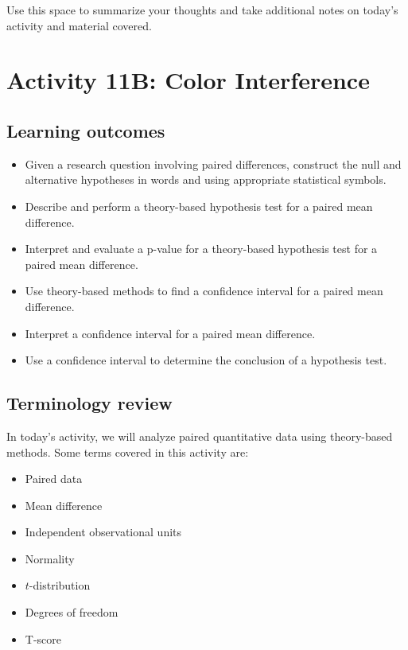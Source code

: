 \documentclass[
]{report}
\begin{document}
Use this space to summarize your thoughts and take additional notes on today's activity and material covered.

\newpage

\hypertarget{activity-11b-color-interference}{%
\section{Activity 11B: Color Interference}\label{activity-11b-color-interference}}


\hypertarget{learning-outcomes-21}{%
\subsection{Learning outcomes}\label{learning-outcomes-21}}

\begin{itemize}
\item
  Given a research question involving paired differences, construct the null and alternative hypotheses
  in words and using appropriate statistical symbols.
\item
  Describe and perform a theory-based hypothesis test for a paired mean difference.
\item
  Interpret and evaluate a p-value for a theory-based hypothesis test for a paired mean difference.
\item
  Use theory-based methods to find a confidence interval for a paired mean difference.
\item
  Interpret a confidence interval for a paired mean difference.
\item
  Use a confidence interval to determine the conclusion of a hypothesis test.
\end{itemize}

\hypertarget{terminology-review-18}{%
\subsection{Terminology review}\label{terminology-review-18}}

In today's activity, we will analyze paired quantitative data using theory-based methods. Some terms covered in this activity are:

\begin{itemize}
\item
  Paired data
\item
  Mean difference
\item
  Independent observational units
\item
  Normality
\item
  \(t\)-distribution
\item
  Degrees of freedom
\item
  T-score
\end{itemize}
\end{document}
